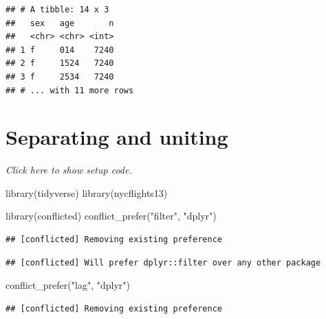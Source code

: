 \documentclass[]{book}
\newenvironment{Shaded}{}{}
\newcommand{\KeywordTok}[1]{\textcolor[rgb]{0.00,0.00,1.00}{#1}}
\newcommand{\NormalTok}[1]{#1}
\newcommand{\OperatorTok}[1]{#1}
\newcommand{\StringTok}[1]{\textcolor[rgb]{0.00,0.50,0.50}{#1}}
\begin{document}
\begin{Shaded}
\end{Shaded}

\begin{verbatim}
## # A tibble: 14 x 3
##   sex   age       n
##   <chr> <chr> <int>
## 1 f     014    7240
## 2 f     1524   7240
## 3 f     2534   7240
## # ... with 11 more rows
\end{verbatim}

\hypertarget{separating-and-uniting}{%
\section{Separating and uniting}\label{separating-and-uniting}}

\emph{Click here to show setup code.}

\begin{Shaded}
\begin{Highlighting}[]
\KeywordTok{library}\NormalTok{(tidyverse)}
\KeywordTok{library}\NormalTok{(nycflights13)}

\KeywordTok{library}\NormalTok{(conflicted)}
\KeywordTok{conflict_prefer}\NormalTok{(}\StringTok{"filter"}\NormalTok{, }\StringTok{"dplyr"}\NormalTok{)}
\end{Highlighting}
\end{Shaded}

\begin{verbatim}
## [conflicted] Removing existing preference
\end{verbatim}

\begin{verbatim}
## [conflicted] Will prefer dplyr::filter over any other package
\end{verbatim}

\begin{Shaded}
\begin{Highlighting}[]
\KeywordTok{conflict_prefer}\NormalTok{(}\StringTok{"lag"}\NormalTok{, }\StringTok{"dplyr"}\NormalTok{)}
\end{Highlighting}
\end{Shaded}

\begin{verbatim}
## [conflicted] Removing existing preference
\end{verbatim}
\end{document}
